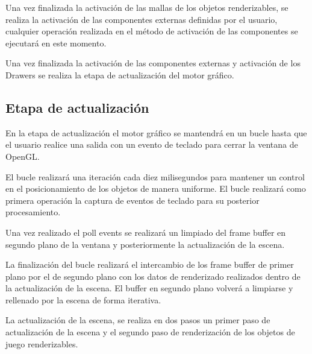 \documentclass[a4paper, 17pt]{book}
\begin{document}
\vspace{1mm} %

Una vez finalizada la activación de las mallas de los objetos renderizables, se realiza la activación de las componentes externas
definidas por el usuario, cualquier operación realizada en el método de activación de las componentes se ejecutará en este momento.

\vspace{1mm} %

Una vez finalizada la activación de las componentes externas y activación de los Drawers se realiza la etapa de actualización del
motor gráfico.

\subsection{Etapa de actualización}
\label{subsec:actualizacion}

En la etapa de actualización el motor gráfico se mantendrá en un bucle hasta que el usuario realice una salida con un evento de teclado
para cerrar la ventana de OpenGL. 

\vspace{1mm} %

El bucle realizará una iteración cada diez milisegundos para mantener un control en el posicionamiento de los objetos de manera uniforme.
El bucle realizará como primera operación la captura de eventos de teclado para su posterior procesamiento.

\vspace{1mm} %

Una vez realizado el poll events se realizará un limpiado del frame buffer en segundo plano de la ventana y posteriormente la actualización
de la escena.

\vspace{1mm} %

La finalización del bucle realizará el intercambio de los frame buffer de primer plano por el de segundo plano con los datos de renderizado
realizados dentro de la actualización de la escena. El buffer en segundo plano volverá a limpiarse y rellenado por la escena de forma iterativa.

\vspace{1mm} %

La actualización de la escena, se realiza en dos pasos un primer paso de actualización de la escena y el segundo paso de renderización
de los objetos de juego renderizables.
\end{document}
